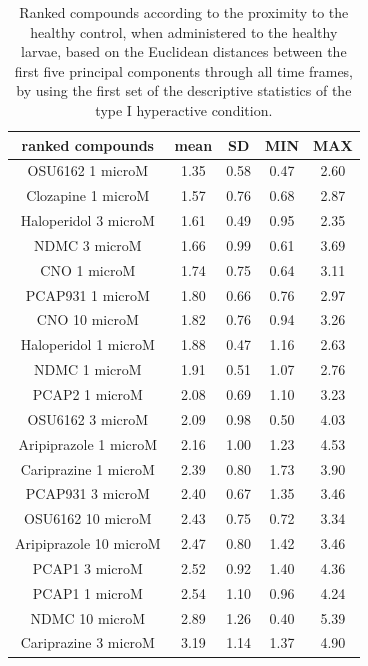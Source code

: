 \begin{table}[h!]\tiny
\centering
\caption{Ranked compounds according to the proximity to the healthy control, when administered to the healthy larvae, based on the Euclidean distances between the first five principal components through all time frames, by using the first set of the descriptive statistics of the type I hyperactive condition.}
\begin{tabular}{|c|c|c|c|c|}
\hline
ranked compounds             & mean & SD   & MIN  & MAX   \\ \hline
OSU6162 1 microM       & 1.35 & 0.58 & 0.47 & 2.60   \\ \hline
Clozapine 1 microM     & 1.57 & 0.76 & 0.68 & 2.87  \\ \hline
Haloperidol 3 microM   & 1.61 & 0.49 & 0.95 & 2.35  \\ \hline
NDMC 3 microM          & 1.66 & 0.99 & 0.61 & 3.69  \\ \hline
CNO 1 microM           & 1.74 & 0.75 & 0.64 & 3.11  \\ \hline
PCAP931 1 microM       & 1.80  & 0.66 & 0.76 & 2.97  \\ \hline
CNO 10 microM          & 1.82 & 0.76 & 0.94 & 3.26  \\ \hline
Haloperidol 1 microM   & 1.88 & 0.47 & 1.16 & 2.63  \\ \hline
NDMC 1 microM          & 1.91 & 0.51 & 1.07 & 2.76  \\ \hline
PCAP2 1 microM         & 2.08 & 0.69 & 1.10  & 3.23  \\ \hline
OSU6162 3 microM       & 2.09 & 0.98 & 0.50  & 4.03  \\ \hline
Aripiprazole 1 microM  & 2.16 & 1.00    & 1.23 & 4.53  \\ \hline
Cariprazine 1 microM   & 2.39 & 0.80  & 1.73 & 3.90   \\ \hline
PCAP931 3 microM       & 2.40  & 0.67 & 1.35 & 3.46  \\ \hline
OSU6162 10 microM      & 2.43 & 0.75 & 0.72 & 3.34  \\ \hline
Aripiprazole 10 microM & 2.47 & 0.80  & 1.42 & 3.46  \\ \hline
PCAP1 3 microM         & 2.52 & 0.92 & 1.40  & 4.36  \\ \hline
PCAP1 1 microM         & 2.54 & 1.10  & 0.96 & 4.24  \\ \hline
NDMC 10 microM         & 2.89 & 1.26 & 0.40  & 5.39  \\ \hline
Cariprazine 3 microM   & 3.19 & 1.14 & 1.37 & 4.90   \\ \hline

\end{tabular}
\end{table}
